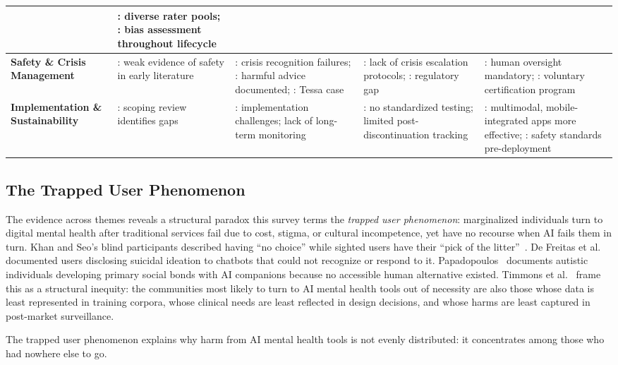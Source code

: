 \begin{table}[!ht]
\begin{tabularx}{\textwidth}{>{\bfseries}p{2.4cm} X X X X}
& \cite{pfohl_2024}: diverse rater pools; \cite{timmons_2023}: bias assessment throughout lifecycle \\
\midrule
Safety \& Crisis Management
& \cite{abd_alrazaq_2020}: weak evidence of safety in early literature
& \cite{de_freitas_2024}: crisis recognition failures; \cite{he_2022}: harmful advice documented; \cite{neda_2023}: Tessa case
& \cite{smith_2023}: lack of crisis escalation protocols; \cite{palmer_2025}: regulatory gap
& \cite{smith_2023}: human oversight mandatory; \cite{palmer_2025}: voluntary certification program \\
\midrule
Implementation \& Sustainability
& \cite{casu_2024}: scoping review identifies gaps
& \cite{dehbozorgi_2025}: implementation challenges; lack of long-term monitoring
& \cite{smith_2023}: no standardized testing; limited post-discontinuation tracking
& \cite{li_2023}: multimodal, mobile-integrated apps more effective; \cite{smith_2023}: safety standards pre-deployment \\
\bottomrule
\end{tabularx}
\end{table}

\subsection{The Trapped User Phenomenon}

The evidence across themes reveals a structural paradox this survey terms the \textit{trapped user phenomenon}: marginalized individuals turn to digital mental health after traditional services fail due to cost, stigma, or cultural incompetence, yet have no recourse when AI fails them in turn. Khan and Seo's blind participants described having ``no choice'' while sighted users have their ``pick of the litter''~\cite{khan_seo_2025}. De Freitas et al.~\cite{de_freitas_2024} documented users disclosing suicidal ideation to chatbots that could not recognize or respond to it. Papadopoulos~\cite{papadopoulos_2025} documents autistic individuals developing primary social bonds with AI companions because no accessible human alternative existed. Timmons et al.~\cite{timmons_2023} frame this as a structural inequity: the communities most likely to turn to AI mental health tools out of necessity are also those whose data is least represented in training corpora, whose clinical needs are least reflected in design decisions, and whose harms are least captured in post-market surveillance.

The trapped user phenomenon explains why harm from AI mental health tools is not evenly distributed: it concentrates among those who had nowhere else to go.

